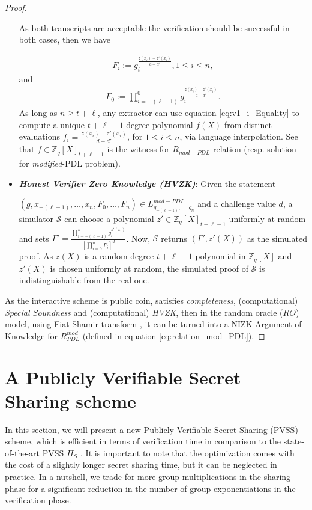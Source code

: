 \begin{proof}
\begin{itemize}
      As both transcripts are acceptable the verification should be successful in both cases, 
      then we have

      \begin{align}\label{eq:v1_i_Equality}
        F_i := g_i^{\frac{z(x_i)-z'(x_i)}{d-d'}}, 1\leq i\leq n,
      \end{align}
      and 
      \begin{align}\label{eq:v1_0_Equality}
        F_0 := \prod_{i=-(\ell-1)}^{0}g_i^{\frac{z(x_i)-z'(x_i)}{d-d'}}.
      \end{align}
      As long as $n\geq t+\ell$, any extractor can use equation \ref{eq:v1_i_Equality} to compute a unique $t+\ell-1$ 
      degree polynomial $f(X)$ from distinct evaluations $f_i=\frac{z(x_i)-z'(x_i)}{d-d'}$, for $1\leq i\leq n$, via language 
      interpolation. See that $f\in\mathbb{Z}_q[X]_{t+\ell-1}$ is the witness for $R_{mod-PDL}$ relation 
      (resp. solution for \textit{modified}-PDL problem).
    \item \textit{\textbf{Honest Verifier Zero Knowledge (HVZK)}}: Given the statement\par $(g,x_{-(\ell-1)},\dots,x_n,F_0,\dots,F_n)\in L_{g_{-(\ell-1)},\dots,g_n}^{mod-PDL}$  
      and a challenge value $d$, a simulator $\mathcal{S}$ can choose a polynomial $z'\in\mathbb{Z}_q[X]_{t+\ell-1}$ uniformly 
      at random and sets $\Gamma'=\frac{\prod_{i=-(\ell-1)}^{n}g_i^{z'(x_i)}}{[\prod_{i=0}^{n}F_i]^d}$. 
      Now, $\mathcal{S}$ returns $(\Gamma',z'(X))$ as the simulated proof. As $z(X)$ is a random 
      degree $t+\ell-1$-polynomial in $\mathbb{Z}_q[X]$ and $z'(X)$ is chosen uniformly at random, 
      the simulated proof of $\mathcal{S}$ is indistinguishable from the real one.
  \end{itemize}
  As the interactive scheme is public coin, satisfies \textit{completeness}, (computational) \textit{Special Soundness} 
  and (computational) \textit{HVZK}, then in the random oracle ($RO$) model, using Fiat-Shamir transform \cite{10.1007/3-540-47721-7_12}, 
  it can be turned into a NIZK Argument of Knowledge for $R_{PDL}^{mod}$ (defined in equation \ref{eq:relation_mod_PDL}).
\end{proof}

\section{A Publicly Verifiable Secret Sharing scheme}
\label{sec:PVSS}
In this section, we will present a new Publicly Verifiable Secret Sharing (PVSS) scheme, which is 
efficient in terms of verification time in comparison to the state-of-the-art PVSS $\Pi_{S}$ \cite{cryptoeprint:2023/1669}. 
It is important to note that the optimization comes with the cost of a slightly longer 
secret sharing time, but it can be neglected in practice. In a nutshell, we trade for more 
group multiplications in the sharing phase for a significant reduction in the  
number of group exponentiations in the verification phase.\par

